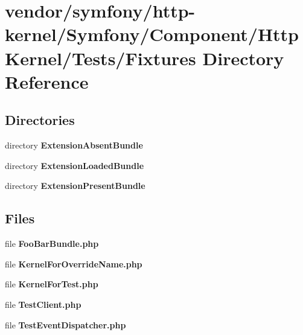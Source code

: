 \section{vendor/symfony/http-\/kernel/\+Symfony/\+Component/\+Http\+Kernel/\+Tests/\+Fixtures Directory Reference}
\label{dir_b7209879a609806cce669e84eb3426f8}
\subsection*{Directories}
\begin{DoxyCompactItemize}
\item 
directory {\bf Extension\+Absent\+Bundle}
\item 
directory {\bf Extension\+Loaded\+Bundle}
\item 
directory {\bf Extension\+Present\+Bundle}
\end{DoxyCompactItemize}
\subsection*{Files}
\begin{DoxyCompactItemize}
\item 
file {\bf Foo\+Bar\+Bundle.\+php}
\item 
file {\bf Kernel\+For\+Override\+Name.\+php}
\item 
file {\bf Kernel\+For\+Test.\+php}
\item 
file {\bf Test\+Client.\+php}
\item 
file {\bf Test\+Event\+Dispatcher.\+php}
\end{DoxyCompactItemize}
